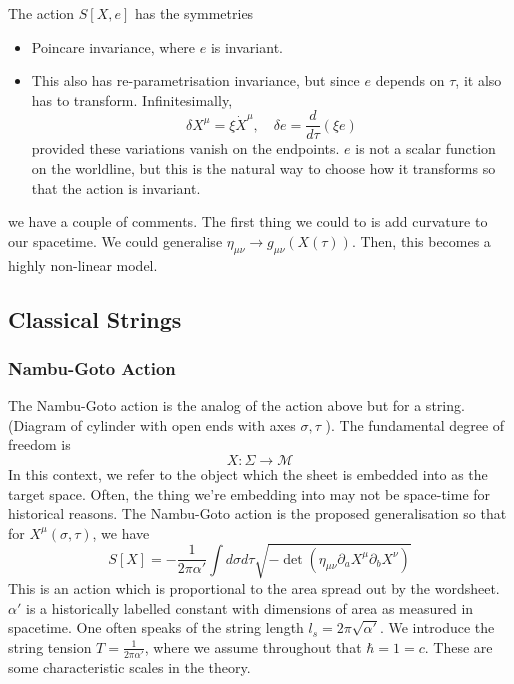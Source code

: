 \documentclass[11pt, oneside]{article}   	%
\theoremstyle{slanted}
\begin{document}
The action $ S \left[  X , e  \right]  $ has the 
symmetries 
\begin{itemize}
\item  Poincare invariance, where $ e $ is 
	invariant. 
\item This also has re-parametrisation 
	invariance, but since $ e $ depends on $ \tau  $, 
	it also has to transform. 
	Infinitesimally, 
	\[
	 \delta X ^ \mu  = \xi \dot{ X } ^ \mu , \quad \delta e  = \frac{ 
	 d }{ d \tau } \left( \xi e  \right)  
	\] provided these variations vanish on the endpoints. 
	$ e $ is not a scalar function on the worldline, 
	but this is the natural way to choose how it 
	transforms so that the action is invariant. 
\end{itemize}
we have a couple of comments. 
The first thing we could to is add curvature 
to our spacetime. 
We could generalise $ \eta _{ \mu \nu } \to g _{ \mu \nu } \left( X \left( \tau  \right)   \right)  $. Then, this becomes 
a highly non-linear model. 

\subsection{Classical Strings}
\subsubsection{Nambu-Goto Action}
The Nambu-Goto action 
is the analog of the action above 
but for a string. 
(Diagram of cylinder with open ends with axes $ \sigma , \tau $ ). 
The fundamental degree of freedom is 
\[
X : \Sigma \to \mathcal{ M } 
\] In this context, we refer to the object which 
the sheet is embedded into as the target space. 
Often, the thing we're embedding into may not 
be space-time for historical reasons. 
The Nambu-Goto action 
is the proposed generalisation 
so that for $ X ^ \mu \left( \sigma , \tau  \right)  $, we have 
\[
S \left[  X  \right] =  - \frac{1}{2 \pi \alpha '  } 
\int d \sigma d \tau \sqrt{  - \det \left( \eta _{ \mu \nu } \partial  _ a X ^ \mu 
\partial  _ b X ^ \nu \right) } 

\] This is an action which 
is proportional to the area 
spread out by the wordsheet. 
$ \alpha  ' $ is a historically labelled 
constant with dimensions of area as measured in 
spacetime. 
One often speaks of the string length $ l _s = 2 \pi \sqrt{ \alpha ' } $. 
We introduce the string tension $ T  = \frac{1}{ 2 \pi \alpha ' } $, 
where we assume throughout that $ \hbar = 1  =c  $. 
These are some characteristic scales in the 
theory. 
\end{document}
